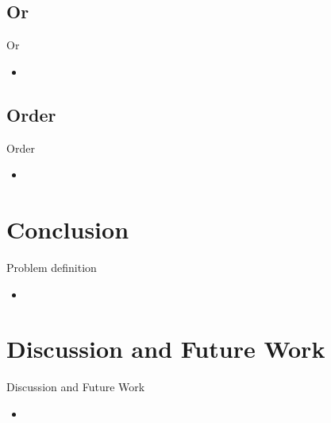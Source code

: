\documentclass[18pt]{beamer}
\begin{document}
	\subsection{Or}
		\begin{frame}{Or}
		
			\begin{itemize}
			\item
			\end{itemize}
		
		\end{frame}
	
	\subsection{Order}
		\begin{frame}{Order}
		
			\begin{itemize}
			\item
			\end{itemize}
		
		\end{frame}
	
\section{Conclusion}
	\begin{frame}{Problem definition}
	
		\begin{itemize}
			\item
		\end{itemize}
	
	\end{frame}

\section{Discussion and Future Work}
	\begin{frame}{Discussion and Future Work}
	
		\begin{itemize}
			\item
		\end{itemize}
	
	\end{frame}
\end{document}

